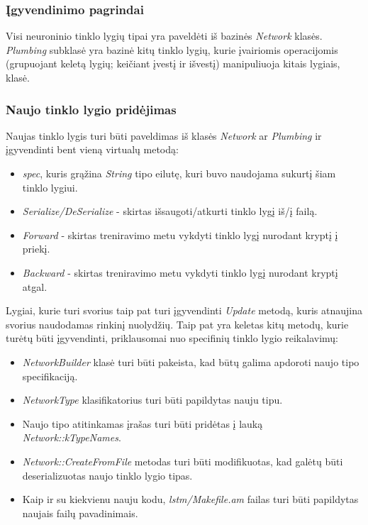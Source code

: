 \documentclass{VUMIFInfBakalaurinis}
\begin{document}
\subsubsection{Įgyvendinimo pagrindai}
Visi neuroninio tinklo lygių tipai yra paveldėti iš bazinės \textit{Network} klasės.
\textit{Plumbing} subklasė yra bazinė kitų tinklo lygių, kurie įvairiomis operacijomis (grupuojant keletą lygių; keičiant įvestį ir išvestį) manipuliuoja kitais lygiais, klasė.

\subsubsection{Naujo tinklo lygio pridėjimas}
Naujas tinklo lygis turi būti paveldimas iš klasės \textit{Network} ar \textit{Plumbing} ir įgyvendinti bent vieną virtualų metodą:

\begin{itemize}
  \item \textit{spec}, kuris grąžina \textit{String} tipo eilutę, kuri buvo naudojama sukurtį šiam tinklo lygiui.
  \item \textit{Serialize/DeSerialize} - skirtas išsaugoti/atkurti tinklo lygį iš/į failą.
  \item \textit{Forward} - skirtas treniravimo metu vykdyti tinklo lygį nurodant kryptį į priekį.
  \item \textit{Backward} - skirtas treniravimo metu vykdyti tinklo lygį nurodant kryptį atgal.
\end{itemize}

Lygiai, kurie turi svorius taip pat turi įgyvendinti \textit{Update} metodą, kuris atnaujina svorius naudodamas rinkinį nuolydžių.
Taip pat yra keletas kitų metodų, kurie turėtų būti įgyvendinti, priklausomai nuo specifinių tinklo lygio reikalavimų:

\begin{itemize}
  \item \textit{NetworkBuilder} klasė turi būti pakeista, kad būtų galima apdoroti naujo tipo specifikaciją.
  \item \textit{NetworkType} klasifikatorius turi būti papildytas nauju tipu.
  \item Naujo tipo atitinkamas įrašas turi būti pridėtas į lauką \textit{Network::kTypeNames}.
  \item \textit{Network::CreateFromFile} metodas turi būti modifikuotas, kad galėtų būti deserializuotas naujo tinklo lygio tipas.
  \item Kaip ir su kiekvienu nauju kodu, \textit{lstm/Makefile.am} failas turi būti papildytas naujais failų pavadinimais. 
\end{itemize}
\end{document}
